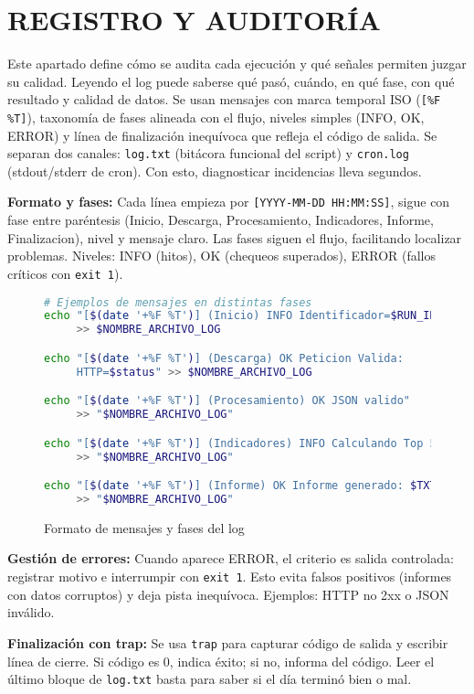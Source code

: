 \chapter{REGISTRO Y AUDITORÍA}

Este apartado define cómo se audita cada ejecución y qué señales permiten juzgar su calidad. Leyendo el log puede saberse qué pasó, cuándo, en qué fase, con qué resultado y calidad de datos. Se usan mensajes con marca temporal ISO (\texttt{[\%F \%T]}), taxonomía de fases alineada con el flujo, niveles simples (INFO, OK, ERROR) y línea de finalización inequívoca que refleja el código de salida. Se separan dos canales: \texttt{log.txt} (bitácora funcional del script) y \texttt{cron.log} (stdout/stderr de cron). Con esto, diagnosticar incidencias lleva segundos.

\textbf{Formato y fases:} Cada línea empieza por \texttt{[YYYY-MM-DD HH:MM:SS]}, sigue con fase entre paréntesis (Inicio, Descarga, Procesamiento, Indicadores, Informe, Finalizacion), nivel y mensaje claro. Las fases siguen el flujo, facilitando localizar problemas. Niveles: INFO (hitos), OK (chequeos superados), ERROR (fallos críticos con \texttt{exit 1}).

\begin{figure}[H]
  \footnotesize
  \begin{lstlisting}[language=bash]
# Ejemplos de mensajes en distintas fases
echo "[$(date '+%F %T')] (Inicio) INFO Identificador=$RUN_ID" 
     >> $NOMBRE_ARCHIVO_LOG

echo "[$(date '+%F %T')] (Descarga) OK Peticion Valida: 
     HTTP=$status" >> $NOMBRE_ARCHIVO_LOG

echo "[$(date '+%F %T')] (Procesamiento) OK JSON valido" 
     >> "$NOMBRE_ARCHIVO_LOG"

echo "[$(date '+%F %T')] (Indicadores) INFO Calculando Top 5" 
     >> "$NOMBRE_ARCHIVO_LOG"

echo "[$(date '+%F %T')] (Informe) OK Informe generado: $TXT" 
     >> "$NOMBRE_ARCHIVO_LOG"
\end{lstlisting}
  \caption{Formato de mensajes y fases del log}
\end{figure}

\textbf{Gestión de errores:} Cuando aparece ERROR, el criterio es salida controlada: registrar motivo e interrumpir con \texttt{exit 1}. Esto evita falsos positivos (informes con datos corruptos) y deja pista inequívoca. Ejemplos: HTTP no 2xx o JSON inválido.

\textbf{Finalización con trap:} Se usa \texttt{trap} para capturar código de salida y escribir línea de cierre. Si código es 0, indica éxito; si no, informa del código. Leer el último bloque de \texttt{log.txt} basta para saber si el día terminó bien o mal.

